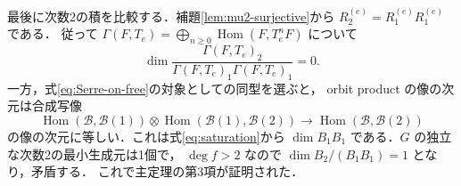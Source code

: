 最後に次数2の積を比較する．補題\ref{lem:mu2-surjective}から
$R^{(e)}_2=R^{(e)}_1R^{(e)}_1$ である．
従って $\Gamma(F,T_e)=\bigoplus_{n\ge0}\operatorname{Hom}(F,T_e^nF)$ について
\[
 \dim\frac{\Gamma(F,T_e)_2}
 {\Gamma(F,T_e)_1\Gamma(F,T_e)_1}=0.
\]
一方，式\eqref{eq:Serre-on-free}の対象としての同型を選ぶと，
orbit product の像の次元は合成写像
\[
 \operatorname{Hom}(\mathcal B,\mathcal B(1))
 \otimes\operatorname{Hom}(\mathcal B(1),\mathcal B(2))
 \longrightarrow\operatorname{Hom}(\mathcal B,\mathcal B(2))
\]
の像の次元に等しい．これは式\eqref{eq:saturation}から
$\dim B_1B_1$ である．$G$ の独立な次数2の最小生成元は1個で，
$\deg f>2$ なので
$\dim B_2/(B_1B_1)=1$ となり，矛盾する．
これで主定理の第3項が証明された．

